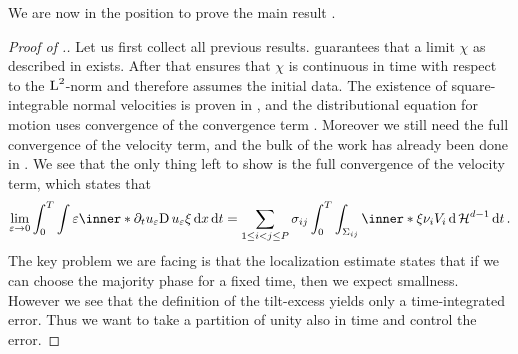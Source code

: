 We are now in the position to prove the main result 
.

\begin{proof}[Proof of .]
	Let us first collect all previous results.
	 guarantees that a limit $ \chi 
	$  as described in  exists.
	After that  ensures that 
	$ \chi $ is continuous in time with respect to the $ \operatorname{L}^{ 2 } $-norm and 
	therefore assumes the initial data. The existence of square-integrable 
	normal velocities is proven in 
	, and the 
	distributional equation for motion uses convergence of the convergence term 
	. Moreover we still need the full 
	convergence of the velocity term, and the bulk of the work has already been 
	done in .
	We see that the only thing left to show is the full convergence 
	of the velocity term, which states that
	\begin{equation*}
		\lim_{ \varepsilon \to 0 }
			\int_{ 0 }^{ T }
				\int
					\varepsilon
					\inner*{ \partial_{ t } u_{ 
							\varepsilon } }{ \diff u_{ \varepsilon } \xi }
				\dd{ x }
			\dd{ t }
		=
		\sum_{ 1 \leq i < j \leq P }
			\sigma_{ i j }
			\int_{ 0 }^{ T }
				\int_{ \Sigma_{ i j } }
					\inner*{ \xi }{ \nu_{ i } }
					V_{ i }
				\dd{ \hm^{ d - 1 } }
			\dd{ t }.
	\end{equation*} 
	The key problem we are facing is that the localization estimate 
	 states that if we can choose the 
	majority phase for a fixed time, then we expect smallness. However we see 
	that the definition of the tilt-excess yields only a time-integrated error. 
	Thus we want to take a partition of unity also in time and control the 
	error.
	

\end{proof}
